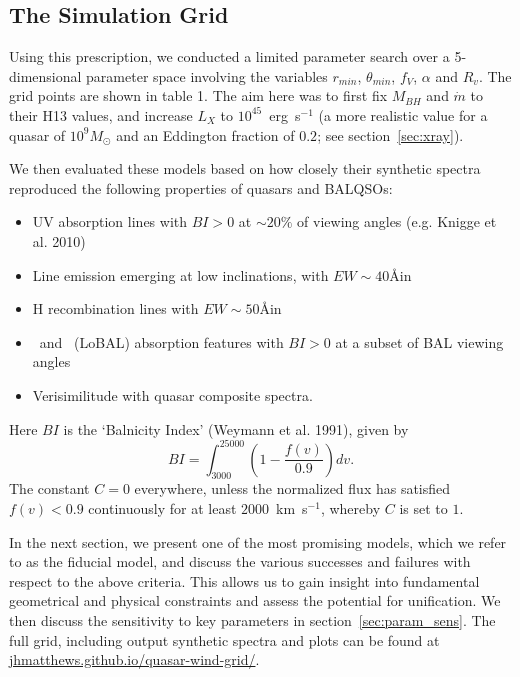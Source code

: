 \documentclass[useAMS,usenatbib]{mn2e_x}
\begin{document}
\subsection{The Simulation Grid}

Using this prescription, we conducted a limited parameter
search over a 5-dimensional parameter space involving the 
variables $r_{min}$, $\theta_{min}$, $f_V$, $\alpha$ and $R_v$.
The grid points are shown in table 1.
The aim here was to first fix $M_{BH}$ and $\dot{m}$ to their H13 values,
and increase $L_X$ to $10^{45}$~erg~s$^{-1}$ (a more realistic value for a 
quasar of $10^9M_\odot$ and an Eddington fraction of $0.2$; see section~\ref{sec:xray}).

We then evaluated these models based on 
how closely their synthetic spectra reproduced the 
following properties of quasars and BALQSOs:

\begin{itemize}
\item UV absorption lines 
with $BI > 0$ at $\sim20\%$ of viewing angles (e.g. Knigge et al. 2010)
\item Line emission emerging at low inclinations, with $EW\sim40$\AA in \civline\ \citep[e.g. ][]{shen2011}
\item H recombination lines with $EW\sim50$\AA in \la\ \citep[e.g. ][]{shen2011}
\item  \mg\ and \al\ (LoBAL) absorption features with $BI > 0$ at a subset of 
BAL viewing angles
\item Verisimilitude with quasar composite spectra.
\end{itemize}
Here $BI$ is the `Balnicity Index' (Weymann et al. 1991), given by
\begin{equation}
BI = \int^{25000}_{3000} \left( 1 - \frac{f(v)}{0.9} \right) dv.
\end{equation}
The constant $C=0$ everywhere, unless the normalized flux
has satisfied $f(v)<0.9$ continuously for at least $2000$~km~s$^{−1}$, 
whereby $C$ is set to $1$.

In the next section, we present one of the most promising models,
which we refer to as the fiducial model, and discuss
the various successes and failures with respect to the above criteria.
This allows us to gain insight into fundamental geometrical 
and physical constraints and assess the potential for unification. 
We then discuss the sensitivity to key parameters in section~\ref{sec:param_sens}.
The full grid, including output synthetic spectra and plots can be found at
\url{jhmatthews.github.io/quasar-wind-grid/}.
\end{document}

